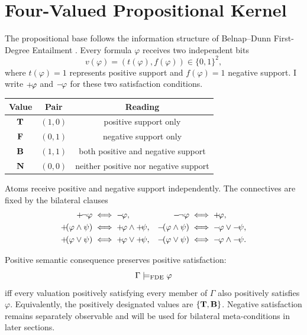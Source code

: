 \section{Four-Valued Propositional Kernel}
\label{sec:kernel}

\statusestablished

The propositional base follows the information structure of Belnap--Dunn First-Degree Entailment \cite{Belnap1977,Dunn1976}. Every formula \(\varphi\) receives two independent bits
\[
  v(\varphi)=(t(\varphi),f(\varphi))\in\{0,1\}^2,
\]
where \(t(\varphi)=1\) represents positive support and \(f(\varphi)=1\) negative support. I write \(+\!\varphi\) and \(-\!\varphi\) for these two satisfaction conditions.

\begin{center}
\begin{tabular}{ccc}
\toprule
Value & Pair & Reading \\
\midrule
\(\mathbf{T}\) & \((1,0)\) & positive support only \\
\(\mathbf{F}\) & \((0,1)\) & negative support only \\
\(\mathbf{B}\) & \((1,1)\) & both positive and negative support \\
\(\mathbf{N}\) & \((0,0)\) & neither positive nor negative support \\
\bottomrule
\end{tabular}
\end{center}

Atoms receive positive and negative support independently. The connectives are fixed by the bilateral clauses
\begin{align*}
\pos{\neg\varphi} &\iff \neginfo{\varphi}, &
\neginfo{\neg\varphi} &\iff \pos{\varphi},\\
\pos{(\varphi\land\psi)} &\iff \pos{\varphi}\land\pos{\psi}, &
\neginfo{(\varphi\land\psi)} &\iff \neginfo{\varphi}\lor\neginfo{\psi},\\
\pos{(\varphi\lor\psi)} &\iff \pos{\varphi}\lor\pos{\psi}, &
\neginfo{(\varphi\lor\psi)} &\iff \neginfo{\varphi}\land\neginfo{\psi}.
\end{align*}

Positive semantic consequence preserves positive satisfaction:
\[
  \Gamma\models_{\mathrm{FDE}}\varphi
\]
iff every valuation positively satisfying every member of \(\Gamma\) also positively satisfies \(\varphi\). Equivalently, the positively designated values are \(\{\mathbf{T},\mathbf{B}\}\). Negative satisfaction remains separately observable and will be used for bilateral meta-conditions in later sections.

